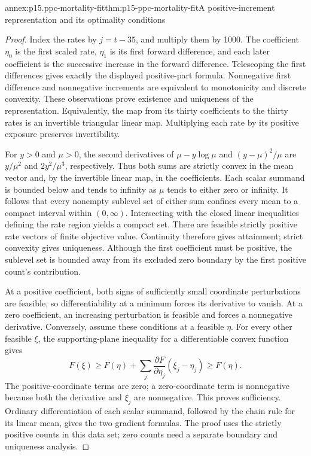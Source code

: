 \begin{annexitem}{annex:p15.ppc-mortality-fit}{thm:p15-ppc-mortality-fit}{A positive-increment representation and its optimality conditions}
\begin{proof}
Index the rates by \(j=t-35\), and multiply them by 1000. The
coefficient \(\eta_0\) is the first scaled rate, \(\eta_1\) is
its first forward difference, and each later coefficient is the successive
increase in the forward difference. Telescoping the first differences
gives exactly the displayed positive-part formula. Nonnegative first
difference and nonnegative increments are equivalent to monotonicity and
discrete convexity. These observations prove existence and uniqueness
of the representation. Equivalently, the map from its thirty coefficients
to the thirty rates is an invertible triangular linear map. Multiplying
each rate by its positive exposure preserves invertibility.

For \(y>0\) and \(\mu>0\), the second derivatives of
\(\mu-y\log\mu\) and \((y-\mu)^2/\mu\) are
\(y/\mu^2\) and \(2y^2/\mu^3\), respectively. Thus both sums
are strictly convex in the mean vector and, by the invertible linear
map, in the coefficients. Each scalar summand is bounded below and tends
to infinity as \(\mu\) tends to either zero or infinity. It follows
that every nonempty sublevel set of either sum confines every mean to a
compact interval within \((0,\infty)\). Intersecting with the closed
linear inequalities defining the rate region yields a compact set.
There are feasible strictly positive rate vectors of finite objective
value. Continuity therefore gives attainment; strict convexity gives
uniqueness. Although the first coefficient must be positive, the sublevel
set is bounded away from its excluded zero boundary by the first positive
count's contribution.

At a positive coefficient, both signs of sufficiently small coordinate
perturbations are feasible, so differentiability at a minimum forces its
derivative to vanish. At a zero coefficient, an increasing perturbation
is feasible and forces a nonnegative derivative. Conversely, assume
these conditions at a feasible \(\eta\). For every other feasible
\(\xi\), the supporting-plane inequality for a differentiable convex
function gives
\[
 F(\xi)\geq F(\eta)+\sum_j
       \frac{\partial F}{\partial\eta_j}(\xi_j-\eta_j)
       \geq F(\eta).
\]
The positive-coordinate terms are zero; a zero-coordinate term is
nonnegative because both the derivative and \(\xi_j\) are nonnegative.
This proves sufficiency. Ordinary differentiation of each scalar summand,
followed by the chain rule for its linear mean, gives the two gradient
formulas. The proof uses the strictly positive counts in this data set;
zero counts need a separate boundary and uniqueness analysis.
\end{proof}
\end{annexitem}

